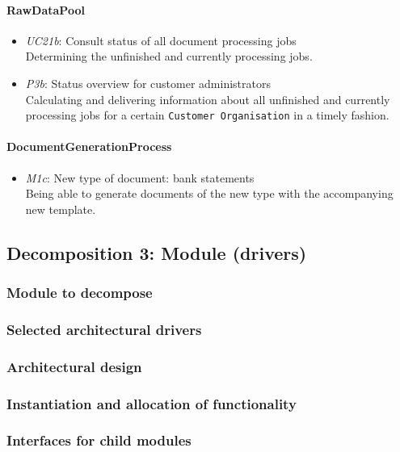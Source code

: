 \documentclass[a4paper,10pt]{article}
\begin{document}
\paragraph{RawDataPool}
\begin{itemize}
	\item \emph{UC21b}: Consult status of all document processing jobs\\
	Determining the unfinished and currently processing jobs.
	\item \emph{P3b}: Status overview for customer administrators\\
	Calculating and delivering information about all unfinished and currently processing jobs for a certain \texttt{Customer Organisation} in a timely fashion.
\end{itemize}

\paragraph{DocumentGenerationProcess}
\begin{itemize}
	\item \emph{M1c}: New type of document: bank statements\\
	Being able to generate documents of the new type with the accompanying new template.
\end{itemize}

\subsection{Decomposition 3: Module (drivers)}
\subsubsection{Module to decompose}
\subsubsection{Selected architectural drivers}
\subsubsection{Architectural design}
\subsubsection{Instantiation and allocation of functionality}
\subsubsection{Interfaces for child modules}
\end{document}
